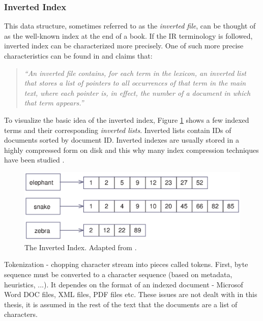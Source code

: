 \subsubsection*{Inverted Index}

This data structure, sometimes referred to as the \textit{inverted file}, can be thought of as the well-known index at the end of a book. If the IR terminology is followed, inverted index can be characterized more precisely. One of such more precise characteristics can be found in \cite{Witten:1999:MGC:323905} and claims that:

\begin{quote}
		\textsl{``An inverted file contains, for each term in the lexicon, an inverted list that stores a list of pointers to all occurrences of that term in the main text, where each pointer is, in effect, the number of a document in which that term appears.''}
	\end{quote}
	
	To visualize the basic idea of the inverted index, Figure \ref{fig:inverted_index} shows a few indexed terms and their corresponding \textit{inverted lists}.
	Inverted lists contain IDs of documents sorted by document ID.
	Inverted indexes are usually stored in a highly compressed form on disk and this why many index compression techniques have been studied \cite{Zhang05efficientquery}. 

\begin{figure}[h]
	\centering
		\includegraphics[scale=0.63]{figures/inverted_index.eps}
	\caption{The Inverted Index. Adapted from \cite{ManningRaghavanSchuetze08}.}
	\label{fig:inverted_index}
\end{figure}

Tokenization - chopping character stream into pieces called tokens.
First, byte sequence must be converted to a character sequence (based on metadata, heuristics, ...).
It dependes on the format of an indexed document - Microsof Word DOC files, XML files, PDF files etc. These issues are not dealt with in this thesis, it is assumed in the rest of the text that the documents are a list of characters.

